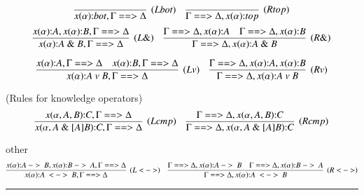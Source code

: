 \documentclass{paper}
\begin{document}
\begin{table}[t]
\[
  \infer[(Lbot)]{
    x(\alpha){:} bot,\Gamma ==> \Delta
  }{
  }
\quad
  \infer[(Rtop)]{
    \Gamma ==> \Delta,x(\alpha){:} top
  }{
  }
\]
\[
  \infer[(L \&)]{
    x(\alpha){:} A\ \&\ B,\Gamma ==> \Delta
  }{
    x(\alpha){:} A, x(\alpha){:} B,\Gamma ==> \Delta
  }
\quad
  \infer[(R \&)]{
    \Gamma ==> \Delta,x(\alpha){:} A\ \&\ B
  }{
    \Gamma ==> \Delta,x(\alpha){:} A
    &
    \Gamma ==> \Delta,x(\alpha){:} B
  }
\]

\[
  \infer[(L v)]{
    x(\alpha){:} A\ v\ B,\Gamma ==> \Delta
  }{
    x(\alpha){:} A,\Gamma ==> \Delta
    &
    x(\alpha){:} B,\Gamma ==> \Delta
  }
\quad
  \infer[(R v)]{
    \Gamma ==> \Delta,x(\alpha){:} A\ v\ B
  }{
    \Gamma ==> \Delta,x(\alpha){:} A, x(\alpha){:} B
  }
\]

\noindent (Rules for knowledge operators)
\[
  \infer[(Lcmp)]{
    x(\alpha,A\ \&\ [A]B){:} C,\Gamma ==> \Delta
  }{
    x(\alpha,A, B){:} C,\Gamma ==> \Delta
  }
\quad
  \infer[(Rcmp)]{
    \Gamma ==> \Delta,x(\alpha,A\ \&\ [A]B){:} C
  }{
    \Gamma ==> \Delta,x(\alpha,A, B){:} C
  }
\]

other
\[
  \infer[(L<->)]{
    x(\alpha){:} A\ <->\ B,\Gamma ==> \Delta
  }{
    x(\alpha){:} A\ ->\ B,x(\alpha){:} B\ ->\ A,\Gamma ==> \Delta
  }
\quad
  \infer[(R<->)]{
    \Gamma ==> \Delta,x(\alpha){:} A\ <->\ B
  }{
    \Gamma ==> \Delta,x(\alpha){:} A\ ->\ B
    &
    \Gamma ==> \Delta,x(\alpha){:} B\ ->\ A
  }
\]
\end{table}

\hrule
\end{document}
